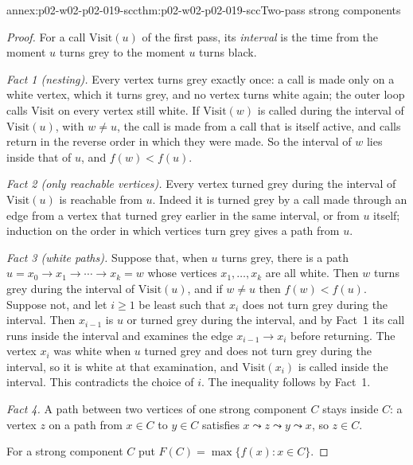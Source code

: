 \begin{annexitem}{annex:p02-w02-p02-019-scc}{thm:p02-w02-p02-019-scc}{Two-pass strong components}
\begin{proof}
For a call \(\mathrm{Visit}(u)\) of the first pass, its \emph{interval} is
the time from the moment \(u\) turns grey to the moment \(u\) turns black.

\emph{Fact 1 (nesting).}  Every vertex turns grey exactly once: a call is made
only on a white vertex, which it turns grey, and no vertex turns white again;
the outer loop calls \(\mathrm{Visit}\) on every vertex still white.  If
\(\mathrm{Visit}(w)\) is called during the interval of \(\mathrm{Visit}(u)\),
with \(w\neq u\), the call is made from a call that is itself active, and
calls return in the reverse order in which they were made.  So the interval of
\(w\) lies inside that of \(u\), and \(f(w)<f(u)\).

\emph{Fact 2 (only reachable vertices).}  Every vertex turned grey during the
interval of \(\mathrm{Visit}(u)\) is reachable from \(u\).  Indeed it is
turned grey by a call made through an edge from a vertex that turned grey
earlier in the same interval, or from \(u\) itself; induction on the order in
which vertices turn grey gives a path from \(u\).

\emph{Fact 3 (white paths).}  Suppose that, when \(u\) turns grey, there is a
path \(u=x_0\to x_1\to\cdots\to x_k=w\) whose vertices \(x_1,\ldots,x_k\) are
all white.  Then \(w\) turns grey during the interval of \(\mathrm{Visit}(u)\),
and if \(w\neq u\) then \(f(w)<f(u)\).  Suppose not, and let \(i\geq 1\) be
least such that \(x_i\) does not turn grey during the interval.  Then
\(x_{i-1}\) is \(u\) or turned grey during the interval, and by Fact~1 its
call runs inside the interval and examines the edge \(x_{i-1}\to x_i\) before
returning.  The vertex \(x_i\) was white when \(u\) turned grey and does not
turn grey during the interval, so it is white at that examination, and
\(\mathrm{Visit}(x_i)\) is called inside the interval.  This contradicts the
choice of \(i\).  The inequality follows by Fact~1.

\emph{Fact 4.}  A path between two vertices of one strong component \(C\)
stays inside \(C\): a vertex \(z\) on a path from \(x\in C\) to \(y\in C\)
satisfies \(x\leadsto z\leadsto y\leadsto x\), so \(z\in C\).

For a strong component \(C\) put \(F(C)=\max\{f(x):x\in C\}\).


\end{proof}
\end{annexitem}
